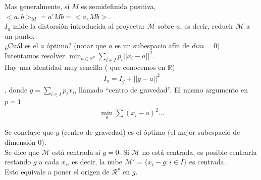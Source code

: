 \documentclass[10pt]{article}
\theoremstyle{plain}
\theoremstyle{definition}
\begin{document}
Mas generalmente, si $M$ es semidefinida positiva, $<a,b>_{M} = a'Mb = <a,Mb>$.\\

$I_{a}$ mide la distorsión introducida al proyectar $\mathcal{M}$ sobre $a$, es decir, reducir $\mathcal{M}$ a un punto.\\

¿Cuál es el $a$ óptimo? (notar que $a$ es un subespacio afín de $dim = 0$)\\

Intentamos resolver $\min_{a\in \mathbb{R}^p} \sum_{i \in I} p_{i}||x_{i}-a||^2$.\\

Hay una identidad muy sencilla ( que conocemos en $\mathbb{R}$)
\begin{align*}
I_{a} = I_{g} + ||g-a||^2
\end{align*}
, donde $g = \sum_{i\in I}p_{i}x_{i}$, llamado ``centro de gravedad''. El mismo argumento en $p=1$
\begin{align*}
\min_{a} \sum (x_{i} - a)^2 \ldots
\end{align*}

Se concluye que $g$ (centro de gravedad) es el óptimo (el mejor subespacio de dimensión 0).\\

Se dice que $\mathcal{M}$ está centrada si $g = 0$. Si $\mathcal{M}$ no está centrada, es posible centrarla restando $g$ a cada $x_{i}$, es decir, la nube $\mathcal{M}' = \{x_{i}-g \colon i \in I\}$ es centrada.\\

Esto equivale a poner el origen de $\mathcal{R}^p$ en $g$.\\
\end{document}
